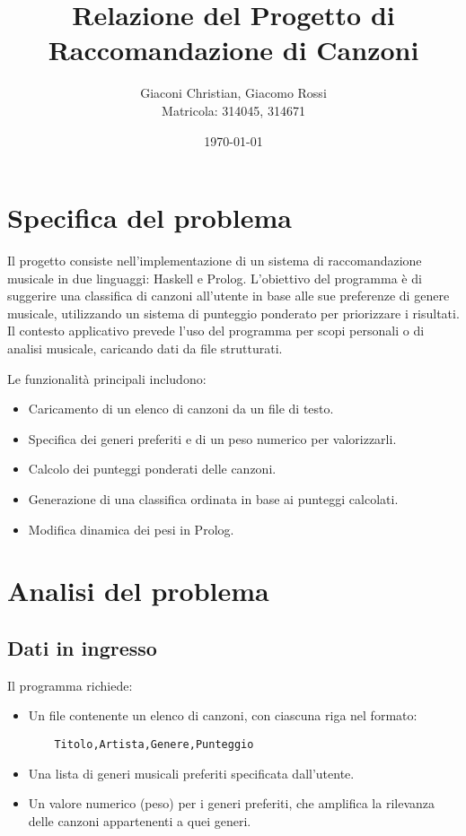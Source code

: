 \documentclass[a4paper,11pt]{article}
\title{\textbf{Relazione del Progetto di Raccomandazione di Canzoni}}
\author{Giaconi Christian, Giacomo Rossi\\Matricola: 314045, 314671}
\date{\today}
\begin{document}
\maketitle

\section{Specifica del problema}
Il progetto consiste nell'implementazione di un sistema di raccomandazione musicale in due linguaggi: Haskell e Prolog. L'obiettivo del programma è di suggerire una classifica di canzoni all'utente in base alle sue preferenze di genere musicale, utilizzando un sistema di punteggio ponderato per priorizzare i risultati. Il contesto applicativo prevede l'uso del programma per scopi personali o di analisi musicale, caricando dati da file strutturati.

Le funzionalità principali includono:
\begin{itemize}
    \item Caricamento di un elenco di canzoni da un file di testo.
    \item Specifica dei generi preferiti e di un peso numerico per valorizzarli.
    \item Calcolo dei punteggi ponderati delle canzoni.
    \item Generazione di una classifica ordinata in base ai punteggi calcolati.
    \item Modifica dinamica dei pesi in Prolog.
\end{itemize}

\section{Analisi del problema}

\subsection{Dati in ingresso}
Il programma richiede:
\begin{itemize}
    \item Un file contenente un elenco di canzoni, con ciascuna riga nel formato:
    \begin{verbatim}
    Titolo,Artista,Genere,Punteggio
    \end{verbatim}
    \item Una lista di generi musicali preferiti specificata dall'utente.
    \item Un valore numerico (peso) per i generi preferiti, che amplifica la rilevanza delle canzoni appartenenti a quei generi.
\end{itemize}
\end{document}
